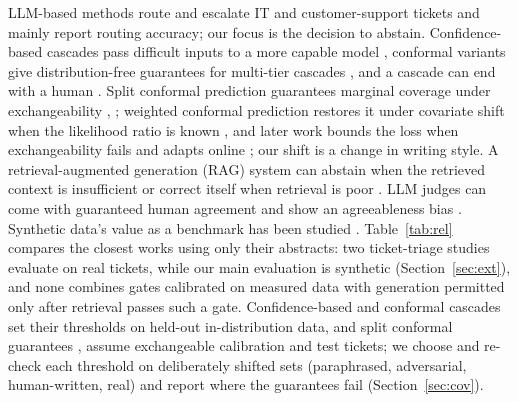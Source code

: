 \documentclass[conference,a4paper]{IEEEtran}
\begin{document}
LLM-based methods route and escalate IT and customer-support tickets \cite{b1,b2,b3} and mainly report routing accuracy; our focus is the decision to abstain. Confidence-based cascades pass difficult inputs to a more capable model \cite{b4}, conformal variants give distribution-free guarantees for multi-tier cascades \cite{b5}, and a cascade can end with a human \cite{b6}. Split conformal prediction guarantees marginal coverage under exchangeability \cite{b7}, \cite{b8}; weighted conformal prediction restores it under covariate shift when the likelihood ratio is known \cite{b9}, and later work bounds the loss when exchangeability fails \cite{b10} and adapts online \cite{b11}; our shift is a change in writing style. A retrieval-augmented generation (RAG) system \cite{b12} can abstain when the retrieved context is insufficient \cite{b13} or correct itself when retrieval is poor \cite{b14}. LLM judges can come with guaranteed human agreement \cite{b15} and show an agreeableness bias \cite{b16}. Synthetic data's value as a benchmark has been studied \cite{b17}. Table~\ref{tab:rel} compares the closest works using only their abstracts: two ticket-triage studies evaluate on real tickets, while our main evaluation is synthetic (Section~\ref{sec:ext}), and none combines gates calibrated on measured data with generation permitted only after retrieval passes such a gate. Confidence-based \cite{b4} and conformal \cite{b5} cascades set their thresholds on held-out in-distribution data, and split conformal guarantees \cite{b7}, \cite{b8} assume exchangeable calibration and test tickets; we choose and re-check each threshold on deliberately shifted sets (paraphrased, adversarial, human-written, real) and report where the guarantees fail (Section~\ref{sec:cov}).
\end{document}
